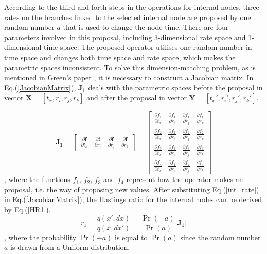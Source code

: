 \documentclass{bmcart}
\begin{document}
According to the third and forth steps in the operations for internal nodes, three rates on the branches linked to the selected internal node are proposed by one random number $a$ that is used to change the node time. There are four parameters involved in this proposal, including 3-dimensional rate space and 1-dimensional time space. The proposed operator utilises one random number in time space and changes both time space and rate space, which makes the parametric spaces inconsistent. To solve this dimension-matching problem, as is mentioned in Green's paper \cite{green1995reversible}, it is necessary to construct a Jacobian matrix.  In Eq.(\ref{JacobianMatrix}), ${\mathbf{J_1}}$ deals with the parametric spaces before the proposal in vector ${\mathbf{X}} = [{t_x},{r_i},{r_j},{r_k}]$ and after the proposal in vector ${\mathbf{Y}} = [{t_x}',{r_i}',{r_j}',{r_k}']$.

\begin{equation}\label{JacobianMatrix}
{\mathbf{J_1}} = \left[ {\begin{array}{*{20}{c}}
  {\frac{{\partial {\mathbf{f}}}}{{\partial {t_x}}}}&{\frac{{\partial {\mathbf{f}}}}{{\partial {r_i}}}}&{\frac{{\partial {\mathbf{f}}}}{{\partial {r_j}}}}&{\frac{{\partial {\mathbf{f}}}}{{\partial {r_k}}}}
\end{array}} \right] = \left[ {\begin{array}{*{20}{c}}
  {\frac{{\partial {f_1}}}{{\partial {t_x}}}}&{\frac{{\partial {f_1}}}{{\partial {r_i}}}}&{\frac{{\partial {f_1}}}{{\partial {r_j}}}}&{\frac{{\partial {f_1}}}{{\partial {r_k}}}} \\
  {\frac{{\partial {f_2}}}{{\partial {t_x}}}}&{\frac{{\partial {f_2}}}{{\partial {r_i}}}}&{\frac{{\partial {f_2}}}{{\partial {r_j}}}}&{\frac{{\partial {f_2}}}{{\partial {r_k}}}} \\
  {\frac{{\partial {f_3}}}{{\partial {t_x}}}}&{\frac{{\partial {f_3}}}{{\partial {r_i}}}}&{\frac{{\partial {f_3}}}{{\partial {r_j}}}}&{\frac{{\partial {f_3}}}{{\partial {r_k}}}} \\
  {\frac{{\partial {f_4}}}{{\partial {t_x}}}}&{\frac{{\partial {f_4}}}{{\partial {r_i}}}}&{\frac{{\partial {f_4}}}{{\partial {r_j}}}}&{\frac{{\partial {f_4}}}{{\partial {r_k}}}}
\end{array}} \right]
\end{equation}
, where the functions ${f_1}$, ${f_2}$, ${f_3}$ and ${f_4}$ represent how the operator makes an proposal, i.e. the way of proposing new values. After substituting Eq.(\ref{int_rate}) in Eq.(\ref{JacobianMatrix}), the Hastings ratio for the internal nodes can be derived by Eq.(\ref{HR1}).
\begin{equation}\label{HR1}
{r_1} = \frac{{q(x',dx)}}{{q(x,dx')}} = \frac{{\Pr ( - a)}}{{\Pr (a)}}\left| {\mathbf{J_1}} \right|
\end{equation}
, where the probability ${\Pr ( - a)}$ is equal to ${\Pr ( a )}$ since the random number $a$ is drawn from a Uniform distribution.
\end{document}
